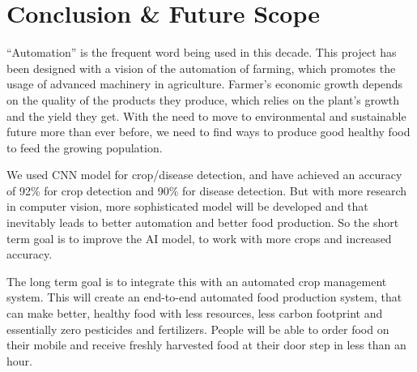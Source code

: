 \documentclass[../Report.tex]{subfiles}
\begin{document}
\chapter{Conclusion \& Future Scope}

``Automation'' is the frequent word being used in this decade. This project has been designed with a vision of the automation of farming, 
which promotes the usage of advanced machinery in agriculture. Farmer's economic growth depends on the quality of the products they produce, 
which relies on the plant's growth and the yield they get. With the need to move to environmental and sustainable future more than ever 
before, we need to find ways to produce good healthy food to feed the growing population.\par

We used CNN model for crop/disease detection, and have achieved an accuracy of 92\% for crop detection and 90\% for disease detection. But 
with more research in computer vision, more sophisticated model will be developed and that inevitably leads to better automation and better
food production. So the short term goal is to improve the AI model, to work with more crops and increased accuracy.\par

The long term goal is to integrate this with an automated crop management system. This will create an end-to-end automated food production
system, that can make better, healthy food with less resources, less carbon footprint and essentially zero pesticides and fertilizers. 
People will be able to order food on their mobile and receive freshly harvested food at their door step in less than an hour.
\end{document}
